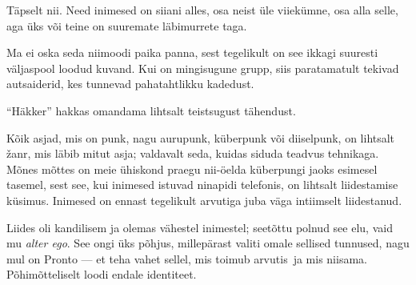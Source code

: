 
Täpselt nii. Need inimesed on siiani 
alles, osa neist üle viiekümne, osa alla selle, aga üks või teine on suuremate 
läbimurrete taga.


Ma ei oska seda niimoodi paika panna, sest tegelikult on see 
ikkagi suuresti väljaspool loodud kuvand. Kui on mingisugune grupp, 
siis paratamatult tekivad autsaiderid, kes tunnevad pahatahtlikku 
kadedust. 


\enquote{Häkker} hakkas omandama lihtsalt teistsugust tähendust.


Kõik asjad, mis on punk, nagu aurupunk, küberpunk või diiselpunk, on lihtsalt 
žanr, mis läbib mitut asja; valdavalt seda, kuidas siduda teadvus 
tehnikaga. Mõnes mõttes on meie ühiskond praegu nii-öelda küberpungi jaoks 
esimesel tasemel, sest see, kui inimesed istuvad ninapidi telefonis, on 
lihtsalt liidestamise küsimus. Inimesed on ennast tegelikult arvutiga juba väga 
intiimselt liidestanud.


Liides oli kandilisem ja olemas vähestel inimestel; seetõttu polnud see elu, vaid 
mu \emph{alter ego}. See ongi üks põhjus, millepärast valiti omale sellised
tunnused, nagu mul on Pronto --- et teha vahet sellel, mis toimub arvutis ja mis 
niisama. Põhimõtteliselt loodi endale identiteet. 

